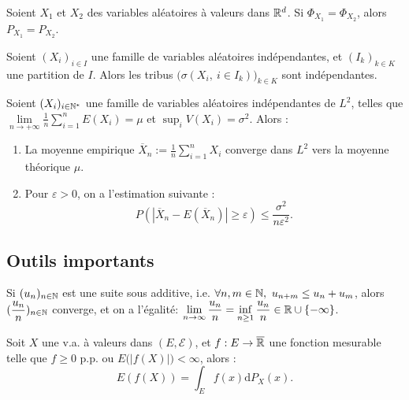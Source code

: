 \documentclass[11pt,a4paper]{article}
\begin{document}
\begin{thmstar}
Soient $X_1$ et $X_2$ des variables aléatoires à valeurs dans $\mathbb R^d$. Si $\Phi_{X_1}=\Phi_{X_2}$, alors $P_{X_1}=P_{X_2}$.
\end{thmstar}

\begin{thmstar}
[Coalitions] Soient $(X_i)_{i\in I}$ une famille de variables aléatoires indépendantes, et $(I_k)_{k\in K}$ une partition de $I$. Alors les tribus $\big(\sigma\left(X_i,\ i\in I_k\right)\big)_{k\in K}$ sont indépendantes.
\end{thmstar}

\begin{thmstar}
 Soient $(X_i)_{i\in \mathbb N^*}$ une famille de variables aléatoires indépendantes de $L^2$, telles que $\lim\limits_{n\to +\infty} \frac{1}{n}\sum_{i=1}^n E(X_i) = \mu$ et $\sup_i V(X_i) = \sigma^2$. Alors : 
\begin{enumerate}
\item La moyenne empirique $\displaystyle \overline{X}_n := \frac{1}{n}\sum_{i=1}^n X_i$ converge dans $L^2$ vers la moyenne théorique $\mu$.
\item Pour $\varepsilon >0$, on a l'estimation suivante : \[P(|\overline{X}_n - E(\overline{X}_n)| \geq \varepsilon) \leq \frac{\sigma^2}{n\varepsilon^2}.\]
\end{enumerate}
\end{thmstar}

\subsection*{Outils importants}

\begin{lemmastar}
[Fekete] Si $(u_n)_{n\in\mathbb N}$ est une suite sous additive, i.e. $\forall n,m\in \N, \ u_{n+m} \leq u_n + u_m$, alors $\displaystyle (\frac{u_n}{n})_{n\in\mathbb N}$ converge, et on a l'égalité:  $\displaystyle \lim\limits_{n\to \infty} \frac{u_n}{n}=\inf_{n\geq 1} \frac{u_n}{n} \in \mathbb R \cup \{ -\infty\}$.
\end{lemmastar}

\begin{propstar}
 Soit $X$ une v.a. à valeurs dans $(E,\mathcal{E})$, et $f :E\to \overline{\mathbb R}$ une fonction mesurable telle que $f\geq0$ p.p. ou $E\big( \left|f(X)\right| \big) <\infty$, alors :
\[E(f(X))=\int_E f(x)\mathrm{d}P_X(x).\]
\end{propstar}
\end{document}
